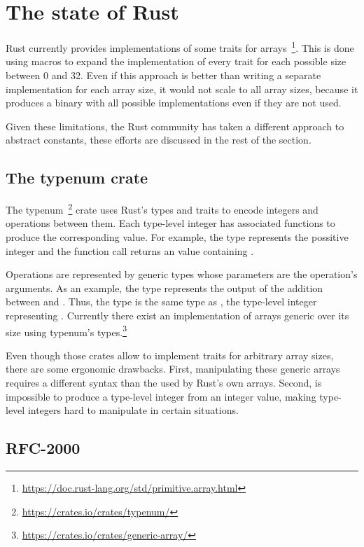 \section{The state of Rust} 

Rust currently provides implementations of some traits for
arrays~\footnote{\url{https://doc.rust-lang.org/std/primitive.array.html}}.
This is done using macros to expand the implementation of every trait for each
possible size between 0 and 32. Even if this approach is better than writing a
separate implementation for each array size, it would not scale to all array
sizes, because it produces a binary with all possible implementations even if
they are not used.

Given these limitations, the Rust community has taken a different approach to
abstract constants, these efforts are discussed in the rest of the section.

\subsection{The typenum crate}

The typenum~\footnote{\url{https://crates.io/crates/typenum/}} crate uses Rust's
types and traits to encode integers and operations between them. Each type-level
integer has associated functions to produce the corresponding value. For
example, the type  represents the possitive integer  and
the function call  returns an  value
containing . 

Operations are represented by generic types whose parameters are the operation's
arguments. As an example, the type  represents the output of
the addition between  and . Thus, the type
 is the same type as , the type-level integer
representing . Currently there exist an implementation of arrays
generic over its size using typenum's
types.\footnote{\url{https://crates.io/crates/generic-array/}}

Even though those crates allow to implement traits for arbitrary array sizes,
there are some ergonomic drawbacks. First, manipulating these generic arrays requires a
different syntax than the used by Rust's own arrays. Second, is impossible to
produce a type-level integer from an integer value, making type-level integers
hard to manipulate in certain situations.

\subsection{RFC-2000} 
\label{subsec:rfc2000}

